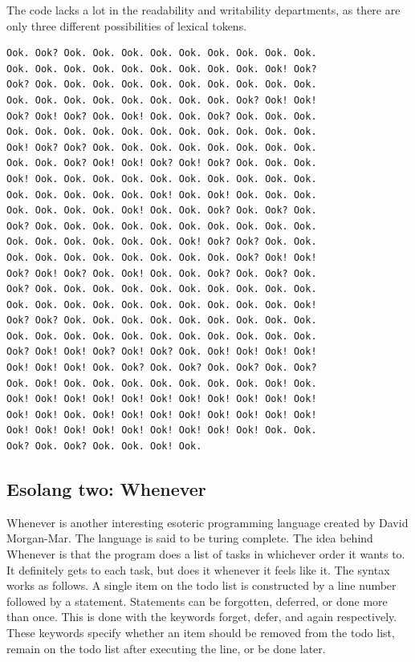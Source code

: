 \documentclass[a4paper]{article}
\begin{document}
	The code lacks a lot in the readability and writability departments, as there are only three different possibilities of lexical tokens.
	\begin{lstlisting}
Ook. Ook? Ook. Ook. Ook. Ook. Ook. Ook. Ook. Ook. Ook. 
Ook. Ook. Ook. Ook. Ook. Ook. Ook. Ook. Ook. Ook! Ook?
Ook? Ook. Ook. Ook. Ook. Ook. Ook. Ook. Ook. Ook. Ook. 
Ook. Ook. Ook. Ook. Ook. Ook. Ook. Ook. Ook? Ook! Ook! 
Ook? Ook! Ook? Ook. Ook! Ook. Ook. Ook? Ook. Ook. Ook. 
Ook. Ook. Ook. Ook. Ook. Ook. Ook. Ook. Ook. Ook. Ook. 
Ook! Ook? Ook? Ook. Ook. Ook. Ook. Ook. Ook. Ook. Ook. 
Ook. Ook. Ook? Ook! Ook! Ook? Ook! Ook? Ook. Ook. Ook. 
Ook! Ook. Ook. Ook. Ook. Ook. Ook. Ook. Ook. Ook. Ook. 
Ook. Ook. Ook. Ook. Ook. Ook! Ook. Ook! Ook. Ook. Ook. 
Ook. Ook. Ook. Ook. Ook! Ook. Ook. Ook? Ook. Ook? Ook. 
Ook? Ook. Ook. Ook. Ook. Ook. Ook. Ook. Ook. Ook. Ook. 
Ook. Ook. Ook. Ook. Ook. Ook. Ook! Ook? Ook? Ook. Ook. 
Ook. Ook. Ook. Ook. Ook. Ook. Ook. Ook. Ook? Ook! Ook! 
Ook? Ook! Ook? Ook. Ook! Ook. Ook. Ook? Ook. Ook? Ook. 
Ook? Ook. Ook. Ook. Ook. Ook. Ook. Ook. Ook. Ook. Ook.
Ook. Ook. Ook. Ook. Ook. Ook. Ook. Ook. Ook. Ook. Ook! 
Ook? Ook? Ook. Ook. Ook. Ook. Ook. Ook. Ook. Ook. Ook. 
Ook. Ook. Ook. Ook. Ook. Ook. Ook. Ook. Ook. Ook. Ook. 
Ook? Ook! Ook! Ook? Ook! Ook? Ook. Ook! Ook! Ook! Ook! 
Ook! Ook! Ook! Ook. Ook? Ook. Ook? Ook. Ook? Ook. Ook? 
Ook. Ook! Ook. Ook. Ook. Ook. Ook. Ook. Ook. Ook! Ook. 
Ook! Ook! Ook! Ook! Ook! Ook! Ook! Ook! Ook! Ook! Ook! 
Ook! Ook! Ook. Ook! Ook! Ook! Ook! Ook! Ook! Ook! Ook! 
Ook! Ook! Ook! Ook! Ook! Ook! Ook! Ook! Ook! Ook. Ook. 
Ook? Ook. Ook? Ook. Ook. Ook! Ook. 
	\end{lstlisting}
	\subsection{Esolang two: Whenever}	
	Whenever is another interesting esoteric programming language created by David Morgan-Mar. The language is said to be turing complete. The idea behind Whenever is that the program does a list of tasks in whichever order it wants to. It definitely gets to each task, but does it whenever it feels like it. The syntax works as follows. A single item on the todo list is constructed by a line number followed by a statement. Statements can be forgotten, deferred, or done more than once. This is done with the keywords forget, defer, and again respectively. These keywords specify whether an item should be removed from the todo list, remain on the todo list after executing the line, or be done later.
	
\end{document}
